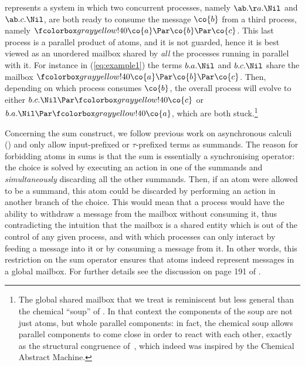 represents a system in which two concurrent processes,
namely $\ab.\aa.\Nil$ and $ \ab.c.\Nil $, are both
ready to consume the message $ \co{b} $
from a third process, namely $\mailbox{\co{a} \Par \co{b} \Par \co{c}}$.
This last process is a parallel product of atoms, and it is not
guarded, hence it is best viewed as an unordered mailbox shared by {\em all}
the processes running in parallel with it. For instance in (\ref{eq:example1})
the terms $ b.a.\Nil$ and $b.c.\Nil$ share the mailbox $\mailbox{ \co{a} \Par \co{b}
  \Par \co{c} }$.  Then, depending on which process consumes $\co{b}$,
the overall process will evolve to either
$b.c.\Nil \Par \mailbox{\co{c}} $ or $b.a.\Nil \Par \mailbox{\co{a}}$,
which are both stuck.\footnote{The global shared mailbox that we
    treat is reminiscent but less general than the chemical ``soup''
    of \cite{DBLP:journals/tcs/BerryB92}.  In that context the
    components of the soup are not just atoms, but whole parallel
    components: in fact, the chemical soup allows parallel components
    to come close in order to react with each other, exactly as
      the structural congruence of~\cite{DBLP:conf/icalp/Milner90}, which indeed was
    inspired by the Chemical Abstract Machine.}

Concerning the sum construct, we follow previous work on
asynchronous calculi
(\cite{ACS96,ACS98,DBLP:books/daglib/0004377,DBLP:journals/iandc/BorealeNP02})
and only allow input-prefixed or $\tau$-prefixed terms as
  summands. %
The reason for forbidding atoms in sums is that the
  \nondeterministic sum is essentially a synchronising operator: the
  choice is solved by executing an action in one of the summands and
  \emph{simultaneously} discarding all the other summands. Then, if an
  atom were allowed to be a summand, this atom could be discarded by
  performing an action in another branch of the choice. This would
  mean that a process would have the ability to withdraw a message
  from the mailbox without consuming it, thus contradicting the
  intuition that the mailbox is a shared entity which is out of the
  control of any given process, and with which processes can only
  interact by feeding a message into it or by consuming a message from
  it.  In other words, this restriction on the sum operator
ensures that atoms %
indeed represent messages in a global
mailbox. For further details see the discussion on page 191 of
\cite{DBLP:books/daglib/0004377}.


